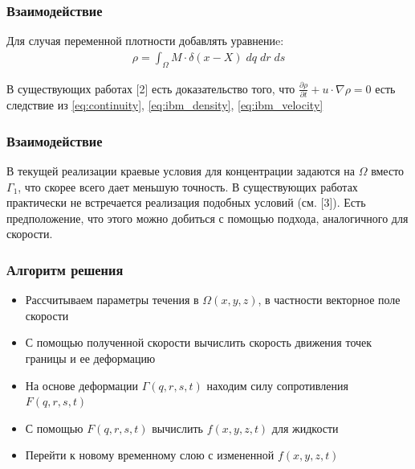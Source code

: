 \documentclass[14pt]{beamer}
\begin{document}
\begin{frame}
\frametitle{Взаимодействие}
Для случая переменной плотности добавлять уравнениe:
\begin{gather}
    \label{eq:ibm_density}
    \rho = \int_{\Omega} M \cdot \delta (x - X)\; dq\; dr\; ds
\end{gather}

В существующих работах [2] есть доказательство того, что $\frac{\partial \rho}{\partial t} + u \cdot \nabla \rho = 0$ есть следствие из \eqref{eq:continuity}, \eqref{eq:ibm_density}, \eqref{eq:ibm_velocity}

\end{frame}

\begin{frame}
\frametitle{Взаимодействие}
В текущей реализации краевые условия для концентрации задаются на $\Omega$ вместо $\Gamma_1$, что скорее всего дает меньшую точность. В существующих работах практически не встречается реализация подобных условий (см. [3]). Есть предположение, что этого можно добиться с помощью подхода, аналогичного для скорости.
\end{frame}

\begin{frame}
\frametitle{Алгоритм решения}
    \begin{itemize}
        \item \alert<+>{Рассчитываем параметры течения в $\Omega(x, y, z)$, в частности векторное поле скорости}
        \item \alert<+>{С помощью полученной скорости вычислить скорость движения точек границы и ее деформацию}
        \item \alert<+>{На основе деформации $\Gamma(q, r, s, t)$ находим силу сопротивления $F(q, r, s, t)$}
        \item \alert<+>{С помощью $F(q, r, s, t)$ вычислить $f(x, y, z, t)$ для жидкости}
        \item \alert<+>{Перейти к новому временному слою с измененной $f(x, y, z, t)$}
    \end{itemize}
\end{frame}
\end{document}

